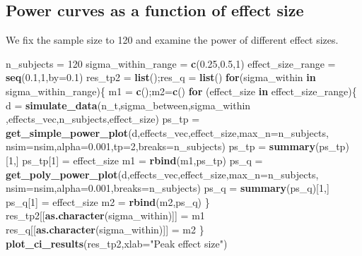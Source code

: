 \documentclass[]{article}
\newenvironment{Shaded}{\begin{snugshade}}{\end{snugshade}}
\newcommand{\KeywordTok}[1]{\textcolor[rgb]{0.13,0.29,0.53}{\textbf{#1}}}
\newcommand{\DataTypeTok}[1]{\textcolor[rgb]{0.13,0.29,0.53}{#1}}
\newcommand{\DecValTok}[1]{\textcolor[rgb]{0.00,0.00,0.81}{#1}}
\newcommand{\FloatTok}[1]{\textcolor[rgb]{0.00,0.00,0.81}{#1}}
\newcommand{\StringTok}[1]{\textcolor[rgb]{0.31,0.60,0.02}{#1}}
\newcommand{\ControlFlowTok}[1]{\textcolor[rgb]{0.13,0.29,0.53}{\textbf{#1}}}
\newcommand{\NormalTok}[1]{#1}
\begin{document}
\subsection{Power curves as a function of effect
size}\label{power-curves-as-a-function-of-effect-size}

We fix the sample size to 120 and examine the power of different effect
sizes.

\begin{Shaded}
\begin{Highlighting}[]
\NormalTok{n_subjects =}\StringTok{ }\DecValTok{120}
\NormalTok{sigma_within_range =}\StringTok{ }\KeywordTok{c}\NormalTok{(}\FloatTok{0.25}\NormalTok{,}\FloatTok{0.5}\NormalTok{,}\DecValTok{1}\NormalTok{)}
\NormalTok{effect_size_range =}\StringTok{ }\KeywordTok{seq}\NormalTok{(}\FloatTok{0.1}\NormalTok{,}\DecValTok{1}\NormalTok{,}\DataTypeTok{by=}\FloatTok{0.1}\NormalTok{)}
\NormalTok{res_tp2 =}\StringTok{ }\KeywordTok{list}\NormalTok{();res_q =}\StringTok{ }\KeywordTok{list}\NormalTok{()}
\ControlFlowTok{for}\NormalTok{(sigma_within }\ControlFlowTok{in}\NormalTok{ sigma_within_range)\{}
\NormalTok{  m1 =}\StringTok{ }\KeywordTok{c}\NormalTok{();m2=}\KeywordTok{c}\NormalTok{()}
  \ControlFlowTok{for}\NormalTok{ (effect_size }\ControlFlowTok{in}\NormalTok{ effect_size_range)\{}
\NormalTok{    d =}\StringTok{ }\KeywordTok{simulate_data}\NormalTok{(n_t,sigma_between,sigma_within ,effects_vec,n_subjects,effect_size)}
\NormalTok{    ps_tp =}\StringTok{ }\KeywordTok{get_simple_power_plot}\NormalTok{(d,effects_vec,effect_size,}\DataTypeTok{max_n=}\NormalTok{n_subjects,}
                                \DataTypeTok{nsim=}\NormalTok{nsim,}\DataTypeTok{alpha=}\FloatTok{0.001}\NormalTok{,}\DataTypeTok{tp=}\DecValTok{2}\NormalTok{,}\DataTypeTok{breaks=}\NormalTok{n_subjects)}
\NormalTok{    ps_tp =}\StringTok{ }\KeywordTok{summary}\NormalTok{(ps_tp)[}\DecValTok{1}\NormalTok{,]}
\NormalTok{    ps_tp[}\DecValTok{1}\NormalTok{] =}\StringTok{ }\NormalTok{effect_size}
\NormalTok{    m1 =}\StringTok{ }\KeywordTok{rbind}\NormalTok{(m1,ps_tp)}
\NormalTok{    ps_q =}\StringTok{ }\KeywordTok{get_poly_power_plot}\NormalTok{(d,effects_vec,effect_size,}\DataTypeTok{max_n=}\NormalTok{n_subjects,}
                              \DataTypeTok{nsim=}\NormalTok{nsim,}\DataTypeTok{alpha=}\FloatTok{0.001}\NormalTok{,}\DataTypeTok{breaks=}\NormalTok{n_subjects)}
\NormalTok{    ps_q =}\StringTok{ }\KeywordTok{summary}\NormalTok{(ps_q)[}\DecValTok{1}\NormalTok{,]}
\NormalTok{    ps_q[}\DecValTok{1}\NormalTok{] =}\StringTok{ }\NormalTok{effect_size}
\NormalTok{    m2 =}\StringTok{ }\KeywordTok{rbind}\NormalTok{(m2,ps_q)}
\NormalTok{  \}}
\NormalTok{  res_tp2[[}\KeywordTok{as.character}\NormalTok{(sigma_within)]] =}\StringTok{ }\NormalTok{m1}
\NormalTok{  res_q[[}\KeywordTok{as.character}\NormalTok{(sigma_within)]] =}\StringTok{ }\NormalTok{m2}
\NormalTok{\}}
\KeywordTok{plot_ci_results}\NormalTok{(res_tp2,}\DataTypeTok{xlab=}\StringTok{"Peak effect size"}\NormalTok{)}
\end{Highlighting}
\end{Shaded}
\end{document}
